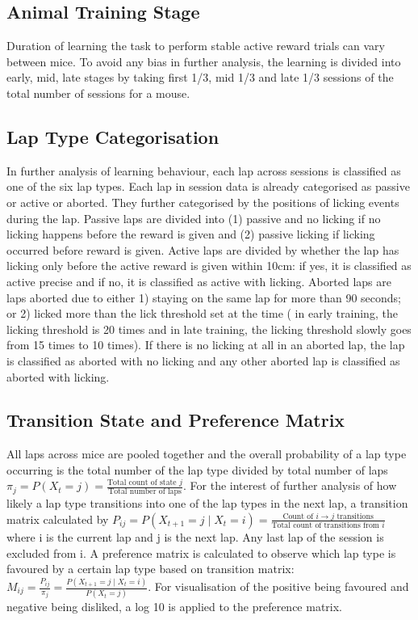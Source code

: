 \subsection{Animal Training Stage}
Duration of learning the task to perform stable active reward trials can vary between mice. To avoid any bias in further analysis, the learning is divided into early, mid, late stages by taking first 1/3, mid 1/3 and late 1/3 sessions of the total number of sessions for a mouse.


\subsection{Lap Type Categorisation}
In further analysis of learning behaviour, each lap across sessions is classified as one of the six lap types. Each lap in session data is already categorised as passive or active or aborted. They further categorised by the positions of licking events during the lap. 
Passive laps are divided into (1) passive and no licking if no licking happens before the reward is given and (2) passive licking if licking occurred before reward is given. 
Active laps are divided by whether the lap has licking only before the active reward is given within 10cm: if yes, it is classified as active precise and if no, it is classified as active with licking. 
Aborted laps are laps aborted due to either 1) staying on the same lap for more than 90 seconds; or 2) licked more than the lick threshold set at the time ( in early training, the licking threshold is 20 times and in late training, the licking threshold slowly goes from 15 times to 10 times). If there is no licking at all in an aborted lap, the lap is classified as aborted with no licking and any other aborted lap is classified as aborted with licking.

\subsection{Transition State and Preference Matrix}
All laps across mice are pooled together and the overall probability of a lap type occurring is the total number of the lap type divided by total number of laps \(\pi_j = P(X_t = j) = \frac{\text{Total count of state } j}{\text{Total number of laps}}\). For the interest of further analysis of how likely a lap type transitions into one of the lap types in the next lap, a transition matrix calculated by \(P_{ij} = P(X_{t+1} = j \mid X_t = i) = \frac{\text{Count of } i \to j \text{ transitions}}{\text{Total count of transitions from } i}\) where i is the current lap and j is the next lap. Any last lap of the session is excluded from i. A preference matrix is calculated to observe which lap type is favoured by a certain lap type based on transition matrix: \(M_{ij} = \frac{P_{ij}}{\pi_j} = \frac{P(X_{t+1} = j \mid X_t = i)}{P(X_t = j)}\). For visualisation of the positive being favoured and negative being disliked, a log 10 is applied to the preference matrix.

